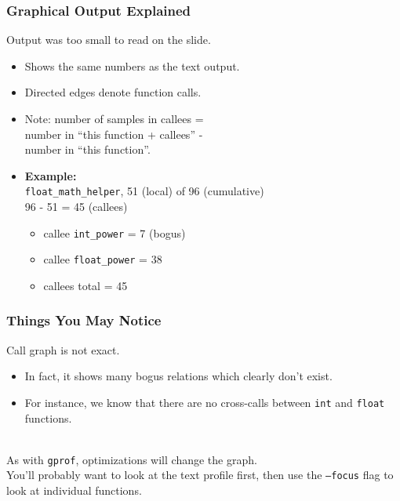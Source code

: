 \begin{frame}
  \frametitle{Graphical Output Explained}

\large
\begin{changemargin}{1.5cm}
  
  Output was too small to read on the slide.

  \begin{itemize}
    \item Shows the same numbers as the text output.
    \item Directed edges denote function calls.
    \item Note: number of samples in callees = \\
      \qquad number in ``this function + callees'' - \\
      \qquad number in ``this function''.\\
    \item {\bf Example:}\\
{{\tt float\_math\_helper}, 51 (local) of 96 (cumulative)} \\
      96 - 51 = 45 (callees)
      \begin{itemize}
        \item callee {\tt int\_power} = 7 (bogus)
        \item callee {\tt float\_power} = 38
        \item callees total = 45
      \end{itemize}

  \end{itemize}
  \end{changemargin}
\end{frame}

\begin{frame}
  \frametitle{Things You May Notice}

  
\large
\begin{changemargin}{1.5cm}
    Call graph is not exact.
    
      \begin{itemize}
        \item In fact, it shows many bogus relations which clearly don't exist.
        \item For instance, we know that there are no cross-calls between {\tt int} and {\tt float} functions.
      \end{itemize}~\\

    As with {\tt gprof}, optimizations will change the
      graph.\\[1em]

    You'll probably want to look at the text profile first, then use the
      {\tt --focus} flag to look at individual functions.
      \end{changemargin}
\end{frame}


